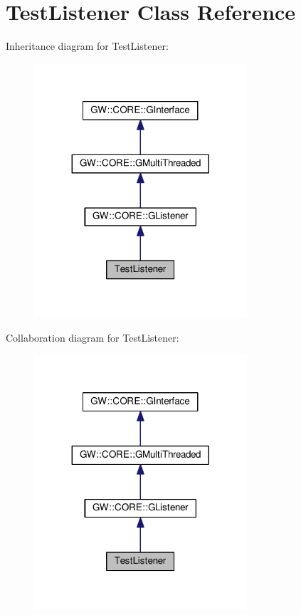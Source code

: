 \hypertarget{classTestListener}{}\section{Test\+Listener Class Reference}
\label{classTestListener}


Inheritance diagram for Test\+Listener\+:
\nopagebreak
\begin{figure}[H]
\begin{center}
\leavevmode
\includegraphics[width=224pt]{classTestListener__inherit__graph}
\end{center}
\end{figure}


Collaboration diagram for Test\+Listener\+:
\nopagebreak
\begin{figure}[H]
\begin{center}
\leavevmode
\includegraphics[width=224pt]{classTestListener__coll__graph}
\end{center}
\end{figure}
